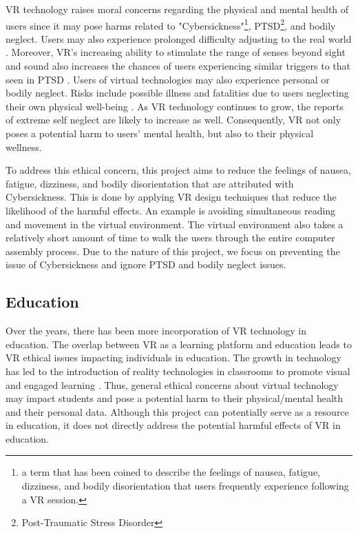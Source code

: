 \documentclass[10pt,twocolumn]{article}
\begin{document}
\par VR technology raises moral concerns regarding the physical and mental health of users since it may pose harms related to "Cybersickness"\footnote{a term that has been coined to describe the feelings of nausea, fatigue, dizziness, and bodily disorientation that users frequently experience following a VR session.}, PTSD\footnote{Post-Traumatic Stress Disorder}, and bodily neglect. Users may also experience prolonged difficulty adjusting to the real world \cite{Spiegel2018TheEthicsOf}. Moreover, VR’s increasing ability to stimulate the range of senses beyond sight and sound also increases the chances of users experiencing similar triggers to that seen in PTSD \cite{Kenwright2018VirtualRealityEthical}. 
Users of virtual technologies may also experience personal or bodily neglect. Risks include possible illness and fatalities due to users neglecting their own physical well-being \cite{Spiegel2018TheEthicsOf}. As VR technology continues to grow, the reports of extreme self neglect are likely to increase as well. Consequently, VR not only poses a potential harm to users' mental health, but also to their physical wellness. 
	
\par To address this ethical concern, this project aims to reduce the feelings of nausea, fatigue, dizziness, and bodily disorientation that are attributed with Cybersickness. This is done by applying VR design techniques that reduce the likelihood of the harmful effects. An example is avoiding simultaneous reading and movement in the virtual environment. The virtual environment also takes a relatively short amount of time to walk the users through the entire computer assembly process. Due to the nature of this project, we focus on preventing the issue of Cybersickness and ignore PTSD and bodily neglect issues.   

\subsection{Education}

\par Over the years, there has been more incorporation of VR technology in education. The overlap between VR as a learning platform and education leads to VR ethical issues impacting individuals in education. The growth in technology has led to the introduction of reality technologies in classrooms to promote visual and engaged learning \cite{Pirker2020VRinCS}. Thus, general ethical concerns about virtual technology may impact students and pose a potential harm to their physical/mental health and their personal data. Although this project can potentially serve as a resource in education, it does not directly address the potential harmful effects of VR in education.
\end{document}
